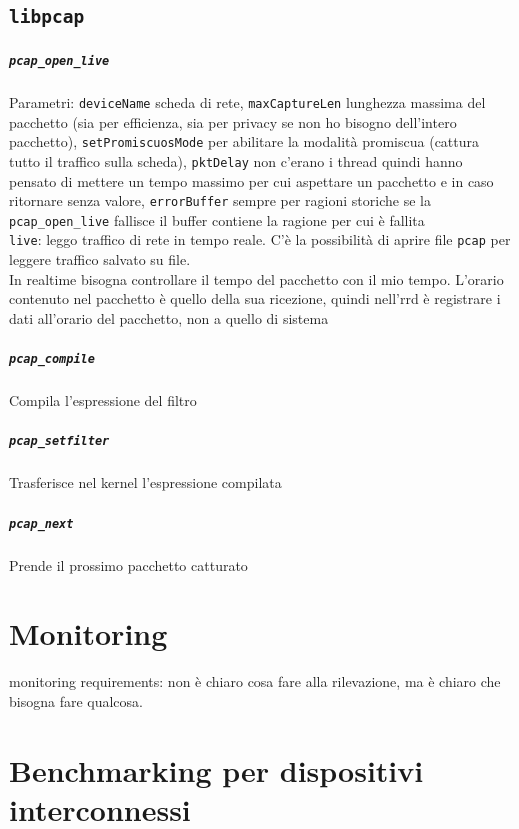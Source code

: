 \documentclass[10pt]{book}
\begin{document}
\section{\texttt{libpcap}}
\paragraph{\texttt{pcap\_open\_live}} Parametri: \texttt{deviceName} scheda di rete, \texttt{maxCaptureLen} lunghezza massima del pacchetto (sia per efficienza, sia per privacy se non ho bisogno dell'intero pacchetto), \texttt{setPromiscuosMode} per abilitare la modalità promiscua (cattura tutto il traffico sulla scheda), \texttt{pktDelay} non c'erano i thread quindi hanno pensato di mettere un tempo massimo per cui aspettare un pacchetto e in caso ritornare senza valore, \texttt{errorBuffer} sempre per ragioni storiche se la \texttt{pcap\_open\_live} fallisce il buffer contiene la ragione per cui è fallita\\
\texttt{live}: leggo traffico di rete in tempo reale. C'è la possibilità di aprire file \texttt{pcap} per leggere traffico salvato su file.\\
In realtime bisogna controllare il tempo del pacchetto con il mio tempo. L'orario contenuto nel pacchetto è quello della sua ricezione, quindi nell'rrd è registrare i dati all'orario del pacchetto, non a quello di sistema
\paragraph{\texttt{pcap\_compile}} Compila l'espressione del filtro
\paragraph{\texttt{pcap\_setfilter}} Trasferisce nel kernel l'espressione compilata
\paragraph{\texttt{pcap\_next}} Prende il prossimo pacchetto catturato
\chapter{Monitoring}
monitoring requirements: non è chiaro cosa fare alla rilevazione, ma è chiaro che bisogna fare qualcosa.
\chapter{Benchmarking per dispositivi interconnessi}
\end{document}
